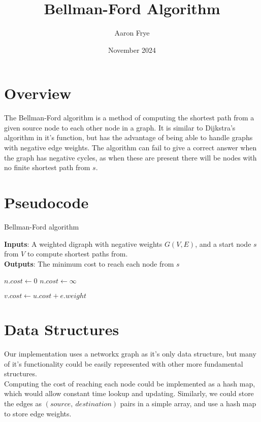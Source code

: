 \documentclass{article}
\title{Bellman-Ford Algorithm}
\author{Aaron Frye}
\date{November 2024}
\begin{document}
\maketitle

\section{Overview}
The Bellman-Ford algorithm is a method of computing the shortest path from a given source node to each other node in a graph. It is similar to Dijkstra's algorithm in it's function, but has the advantage of being able to handle graphs with negative edge weights. The algorithm can fail to give a correct answer when the graph has negative cycles, as when these are present there will be nodes with no finite shortest path from $s$.

\section{Pseudocode}

\begin{algorithm}
    \caption{Bellman-Ford algorithm}
    \textbf{Inputs}: A weighted digraph with negative weights $G(V, E)$, and a start node $s$ from $V$ to compute shortest paths from. \\
    \textbf{Outputs}: The minimum cost to reach each node from $s$
    \begin{algorithmic}
            \State $n.cost \gets 0$
        \Else
            \State $n.cost \gets \infty$
        \EndIf
    \EndFor

                \State $v.cost \gets u.cost + e.weight$
            \EndIf
        \EndFor
    \EndFor
    \end{algorithmic}
\end{algorithm}


\section{Data Structures}
Our implementation uses a networkx graph as it's only data structure, but many of it's functionality could be easily represented with other more fundamental structures. \\ 

Computing the cost of reaching each node could be implemented as a hash map, which would allow constant time lookup and updating. Similarly, we could store the edges as $(source,\ destination)$ pairs in a simple array, and use a hash map to store edge weights.
\end{document}
